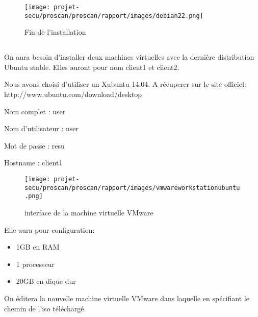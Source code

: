 \documentclass[11pt,a4paper,titlepage, oneside]{article}
\begin{document}
	\newpage
                \begin{figure}[h]
                        \centering
                        \texttt{[image: projet-secu/proscan/proscan/rapport/images/debian22.png]}
                        \caption{Fin de l'installation}
                \end{figure}
\subsection{{\color{blue}{Installation du client ubuntu}}}
\paragraph{}
	        On aura besoin d'installer deux machines virtuelles avec la dernière distribution Ubuntu stable. Elles auront pour nom client1 et client2.

		Nous avons choisi d'utiliser un Xubuntu 14.04. A récuperer sur le site officiel: http://www.ubuntu.com/download/desktop
		
		Nom complet : user
			
		Nom d'utilisateur : user
		
		Mot de passe : resu
		
		Hostname : client1
		
		\begin{figure}[h]
  			\centering
  			\texttt{[image: projet-secu/proscan/proscan/rapport/images/vmwareworkstationubuntu.png]}
			\caption{interface de la machine virtuelle VMware}
		\end{figure}
		Elle aura pour configuration:
		\begin{itemize}
                        \item{1GB en RAM}
                        \item{1 processeur}
                        \item{20GB en dique dur}
                \end{itemize}
		On éditera la nouvelle machine virtuelle VMware dans laquelle en spécifiant le chemin de l'iso téléchargé.
		
\end{document}
